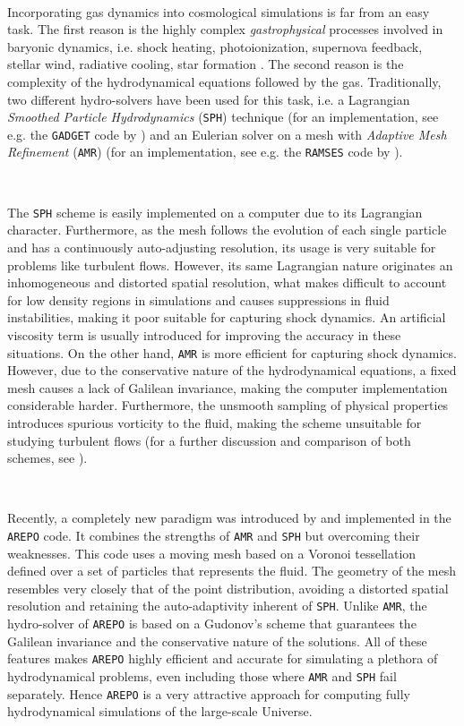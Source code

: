 \documentclass[a4,useAMS,usenatbib,usegraphicx,12pt]{article}
\begin{document}
\

Incorporating gas dynamics into cosmological simulations is far from an easy 
task. The first reason is the highly complex \textit{gastrophysical} processes 
involved in baryonic dynamics, i.e. shock heating, photoionization, supernova 
feedback, stellar wind, radiative cooling, star formation \citep{Bond93}. The
second reason is the complexity of the hydrodynamical equations followed by 
the gas. Traditionally, two different hydro-solvers have been used for this 
task, i.e. a Lagrangian \textit{Smoothed Particle Hydrodynamics} (\texttt{SPH}) 
technique \citep{Monaghan92} (for an implementation, see e.g. the \texttt{GADGET} 
code by \citet{Springel05}) and an Eulerian solver on a mesh with \textit{
Adaptive Mesh Refinement} (\texttt{AMR}) \citep{Berger89} (for an implementation, 
see e.g. the \texttt{RAMSES} code by \citet{Teyssier02}). 

\

The \texttt{SPH} scheme is easily implemented on a computer due to its 
Lagrangian character. Furthermore, as the mesh follows the evolution of each 
single particle and has a continuously auto-adjusting resolution, its usage is 
very suitable for problems like turbulent flows. However, its same Lagrangian 
nature originates an inhomogeneous and distorted spatial resolution, what makes 
difficult to account for low density regions in simulations and causes 
suppressions in fluid instabilities, making it poor suitable for capturing shock
dynamics. An artificial viscosity term is usually introduced for improving the 
accuracy in these situations. On the other hand, \texttt{AMR} is more efficient 
for capturing shock dynamics. However, due to the conservative nature of the 
hydrodynamical equations, a fixed mesh causes a lack of Galilean invariance, 
making the computer implementation considerable harder. Furthermore, the 
unsmooth sampling of physical properties introduces spurious vorticity to the 
fluid, making the scheme unsuitable for studying turbulent flows (for a further
discussion and comparison of both schemes, see \citet{Plewa01}).

\

Recently, a completely new paradigm was introduced by \citet{Springel10} and 
implemented in the \texttt{AREPO} code. It combines the strengths of 
\texttt{AMR} and \texttt{SPH} but overcoming their weaknesses. This code uses 
a moving mesh based on a Voronoi tessellation defined over a set of particles
that represents the fluid. The geometry of the mesh resembles very closely that 
of the point distribution, avoiding a distorted spatial resolution and retaining 
the auto-adaptivity inherent of \texttt{SPH}. Unlike \texttt{AMR}, the 
hydro-solver of \texttt{AREPO} is based on a Gudonov's scheme that guarantees the
Galilean invariance and the conservative nature of the solutions. All of these 
features makes \texttt{AREPO} highly efficient and accurate for simulating a 
plethora of hydrodynamical problems, even including those where \texttt{AMR} and
\texttt{SPH} fail separately. Hence \texttt{AREPO} is a very attractive approach 
for computing fully hydrodynamical simulations of the large-scale Universe.
\end{document}
